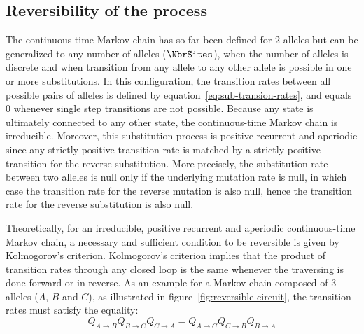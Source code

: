 
\subsection{Reversibility of the process}
The continuous-time Markov chain has so far been defined for $2$ alleles but can be generalized to any number of alleles ($\NbrSites$), when the number of alleles is discrete and when transition from any allele to any other allele is possible in one or more substitutions.
In this configuration, the transition rates between all possible pairs of alleles is defined by equation~\ref{eq:sub-transion-rates}, and equals $0$ whenever single step transitions are not possible.
Because any state is ultimately connected to any other state, the continuous-time Markov chain is irreducible.
Moreover, this substitution process is positive recurrent and aperiodic since any strictly positive transition rate is matched by a strictly positive transition for the reverse substitution.
More precisely, the substitution rate between two alleles is null only if the underlying mutation rate is null, in which case the transition rate for the reverse mutation is also null, hence the transition rate for the reverse substitution is also null.

Theoretically, for an irreducible, positive recurrent and aperiodic continuous-time Markov chain, a necessary and sufficient condition to be reversible is given by Kolmogorov's criterion.
Kolmogorov's criterion implies that the product of transition rates through any closed loop is the same whenever the traversing is done forward or in reverse.
As an example for a Markov chain composed of $3$ alleles ($A$, $B$ and $C$), as illustrated in figure~\ref{fig:reversible-circuit}, the transition rates must satisfy the equality:
\begin{equation}
    Q_{A \to B}Q_{B \to C}Q_{C \to A} = Q_{A \to C}Q_{C \to B}Q_{B \to A}
\end{equation}

